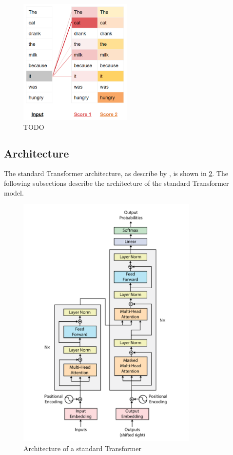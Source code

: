 \begin{figure}[htp]
    \centering
    \includegraphics[width=0.5\textwidth]{figures/attention-scores-example.png}
    \caption{TODO}
    \label{fig:attention-scores-example}
\end{figure}


\subsection{Architecture}
\label{sec:transformer-architecture}
The standard Transformer architecture, as describe by \citeyear{vaswani2017attention}, is shown in \cref{fig:transformer-architecture}. The following subsections describe the architecture of the standard Transformer model.

\begin{figure}[htp]
    \centering
    \includegraphics[width=0.8\textwidth]{figures/transformer_architecture.pdf}
    \caption{Architecture of a standard Transformer \textcite{vaswani2017attention}}
    \label{fig:transformer-architecture}
\end{figure}


